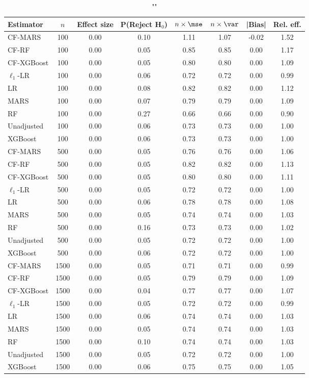\begin{table}
\centering
\caption{""}
\begin{tabular}{lccccccc}
\toprule
Estimator & $n$ & Effect size & P(Reject H$_0$) & $n\times\mse$ & $n\times \var$ & |Bias| & Rel. eff.\\ \midrule
CF-MARS & 100 & 0.00 & 0.10 & 1.11 & 1.07 & -0.02 & 1.52 \\ 
CF-RF & 100 & 0.00 & 0.05 & 0.85 & 0.85 &  0.00 & 1.17 \\ 
CF-XGBoost & 100 & 0.00 & 0.05 & 0.80 & 0.80 &  0.00 & 1.09 \\ 
$\ell_1$-LR & 100 & 0.00 & 0.06 & 0.72 & 0.72 &  0.00 & 0.99 \\ 
LR & 100 & 0.00 & 0.08 & 0.82 & 0.82 &  0.00 & 1.12 \\ 
MARS & 100 & 0.00 & 0.07 & 0.79 & 0.79 &  0.00 & 1.09 \\ 
RF & 100 & 0.00 & 0.27 & 0.66 & 0.66 &  0.00 & 0.90 \\ 
Unadjusted & 100 & 0.00 & 0.06 & 0.73 & 0.73 &  0.00 & 1.00 \\ 
XGBoost & 100 & 0.00 & 0.06 & 0.73 & 0.73 &  0.00 & 1.00 \\ \addlinespace 
CF-MARS & 500 & 0.00 & 0.05 & 0.76 & 0.76 &  0.00 & 1.06 \\ 
CF-RF & 500 & 0.00 & 0.05 & 0.82 & 0.82 &  0.00 & 1.13 \\ 
CF-XGBoost & 500 & 0.00 & 0.05 & 0.80 & 0.80 &  0.00 & 1.11 \\ 
$\ell_1$-LR & 500 & 0.00 & 0.05 & 0.72 & 0.72 &  0.00 & 1.00 \\ 
LR & 500 & 0.00 & 0.06 & 0.78 & 0.78 &  0.00 & 1.08 \\ 
MARS & 500 & 0.00 & 0.05 & 0.74 & 0.74 &  0.00 & 1.03 \\ 
RF & 500 & 0.00 & 0.16 & 0.73 & 0.73 &  0.00 & 1.02 \\ 
Unadjusted & 500 & 0.00 & 0.05 & 0.72 & 0.72 &  0.00 & 1.00 \\ 
XGBoost & 500 & 0.00 & 0.06 & 0.72 & 0.72 &  0.00 & 1.00 \\ \addlinespace 
CF-MARS & 1500 & 0.00 & 0.05 & 0.71 & 0.71 &  0.00 & 0.99 \\ 
CF-RF & 1500 & 0.00 & 0.05 & 0.79 & 0.79 &  0.00 & 1.09 \\ 
CF-XGBoost & 1500 & 0.00 & 0.04 & 0.77 & 0.77 &  0.00 & 1.07 \\ 
$\ell_1$-LR & 1500 & 0.00 & 0.05 & 0.72 & 0.72 &  0.00 & 0.99 \\ 
LR & 1500 & 0.00 & 0.06 & 0.74 & 0.74 &  0.00 & 1.03 \\ 
MARS & 1500 & 0.00 & 0.05 & 0.74 & 0.74 &  0.00 & 1.03 \\ 
RF & 1500 & 0.00 & 0.10 & 0.74 & 0.74 &  0.00 & 1.03 \\ 
Unadjusted & 1500 & 0.00 & 0.05 & 0.72 & 0.72 &  0.00 & 1.00 \\ 
XGBoost & 1500 & 0.00 & 0.06 & 0.75 & 0.75 &  0.00 & 1.05 \\
\bottomrule
\end{tabular}
\end{table}

